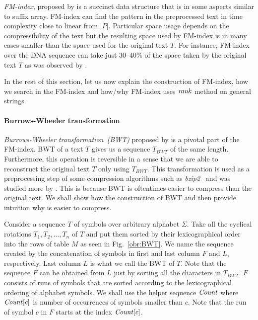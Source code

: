 \textit{FM-index}, proposed by \cite{ferragina2000opportunistic} is a succinct data structure that
is in some aspects similar to suffix array. FM-index can find the pattern in the preprocessed text
in time complexity close to linear from $|P|$. Particular space usage depends on the compressibility
of the text but the resulting space used by FM-index is in many cases smaller than the space used for
the original text $T$. For instance, FM-index over the DNA sequence can take just 30--40\% of the space
taken by the original text $T$ as was observed by \cite{ferragina2001experimental}.

In the rest of this section, let us now explain the construction of FM-index, how we search in the
FM-index and how/why FM-index uses $\mathit{rank}$ method on general strings.

\paragraph{Burrows-Wheeler transformation}

\textit{Burrows-Wheeler transformation~(BWT)} proposed by \cite{burrows1994block} is a pivotal
part of the FM-index. BWT of a text $T$ gives us a sequence $\mathit{T_{BWT}}$ of the same
length. Furthermore, this operation is reversible in a sense that we are able to reconstruct
the original text $T$ only using $\mathit{T_{BWT}}$. This transformation is used as a
preprocessing step of some compression algorithms such as \textit{bzip2}~\citep{seward1996bzip2}
and was studied more by \cite{manzini2001analysis}. This is because BWT is oftentimes easier
to compress than the original text. We shall show how the construction of BWT and then provide
intuition why is easier to compress.

Consider a sequence $T$ of symbols over arbitrary alphabet $\Sigma$. Take all the cyclical
rotations $T_1, T_2, \ldots ,T_n$ of $T$ and put them sorted by their lexicographical
order into the rows of table $M$ as seen in Fig.~\ref{obr:BWT}. We name the sequence created by the
concatenation of symbols in first and last column $F$ and $L$, respectively. Last column $L$
is what we call the BWT of $T$. Note that the sequence $F$ can be obtained from $L$ just by
sorting all the characters in $\mathit{T_{BWT}}$. $F$ consists of runs of symbols that are
sorted according to the lexicographical ordering of alphabet symbols. We shall use the helper
sequence $\mathit{Count}$ where $\mathit{Count}[c]$ is number of occurrences of symbols smaller than $c$.
Note that the run of symbol $c$ in $F$ starts at the index $\mathit{Count}[c]$.

